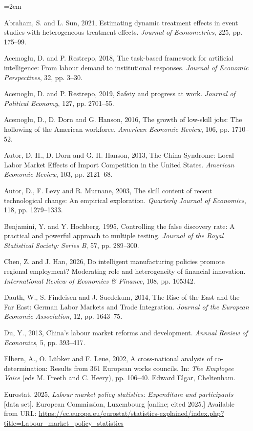 \documentclass[12pt]{article}
\begin{document}
\begin{list}{}{\leftmargin=2em}\setlength{\itemsep}{2pt}
\item Abraham, S. and L. Sun, 2021, Estimating dynamic treatment effects in event studies with heterogeneous treatment effects. \emph{Journal of Econometrics}, 225, pp. 175--99.
\item Acemoglu, D. and P. Restrepo, 2018, The task-based framework for artificial intelligence: From labour demand to institutional responses. \emph{Journal of Economic Perspectives}, 32, pp. 3--30.
\item Acemoglu, D. and P. Restrepo, 2019, Safety and progress at work. \emph{Journal of Political Economy}, 127, pp. 2701--55.
\item Acemoglu, D., D. Dorn and G. Hanson, 2016, The growth of low-skill jobs: The hollowing of the American workforce. \emph{American Economic Review}, 106, pp. 1710--52.
\item Autor, D. H., D. Dorn and G. H. Hanson, 2013, The China Syndrome: Local Labor Market Effects of Import Competition in the United States. \emph{American Economic Review}, 103, pp. 2121--68.
\item Autor, D., F. Levy and R. Murnane, 2003, The skill content of recent technological change: An empirical exploration. \emph{Quarterly Journal of Economics}, 118, pp. 1279--1333.
\item Benjamini, Y. and Y. Hochberg, 1995, Controlling the false discovery rate: A practical and powerful approach to multiple testing. \emph{Journal of the Royal Statistical Society: Series B}, 57, pp. 289--300.
\item Chen, Z. and J. Han, 2026, Do intelligent manufacturing policies promote regional employment? Moderating role and heterogeneity of financial innovation. \emph{International Review of Economics \& Finance}, 108, pp. 105342.
\item Dauth, W., S. Findeisen and J. Suedekum, 2014, The Rise of the East and the Far East: German Labor Markets and Trade Integration. \emph{Journal of the European Economic Association}, 12, pp. 1643--75.
\item Du, Y., 2013, China's labour market reforms and development. \emph{Annual Review of Economics}, 5, pp. 393--417.
\item Elbern, A., O. L\"ubker and F. Leue, 2002, A cross-national analysis of co-determination: Results from 361 European works councils. In: \emph{The Employee Voice} (eds M. Freeth and C. Heery), pp. 106--40. Edward Elgar, Cheltenham.
\item Eurostat, 2025, \emph{Labour market policy statistics: Expenditure and participants} [data set]. European Commission, Luxembourg [online; cited 2025.] Available from URL: \url{https://ec.europa.eu/eurostat/statistics-explained/index.php?title=Labour_market_policy_statistics}

\end{list}
\end{document}

